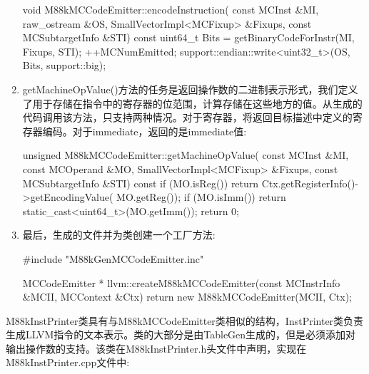 \begin{enumerate}
\begin{cpp}
void M88kMCCodeEmitter::encodeInstruction(
        const MCInst &MI, raw_ostream &OS,
        SmallVectorImpl<MCFixup> &Fixups,
        const MCSubtargetInfo &STI) const {
    uint64_t Bits =
        getBinaryCodeForInstr(MI, Fixups, STI);
    ++MCNumEmitted;
    support::endian::write<uint32_t>(OS, Bits,
                                     support::big);
}
\end{cpp}

\item
getMachineOpValue()方法的任务是返回操作数的二进制表示形式，我们定义了用于存储在指令中的寄存器的位范围，计算存储在这些地方的值。从生成的代码调用该方法，只支持两种情况。对于寄存器，将返回目标描述中定义的寄存器编码。对于immediate，返回的是immediate值:

\begin{cpp}
unsigned M88kMCCodeEmitter::getMachineOpValue(
        const MCInst &MI, const MCOperand &MO,
        SmallVectorImpl<MCFixup> &Fixups,
        const MCSubtargetInfo &STI) const {
    if (MO.isReg())
        return Ctx.getRegisterInfo()->getEncodingValue(
            MO.getReg());
    if (MO.isImm())
        return static_cast<uint64_t>(MO.getImm());
    return 0;
}
\end{cpp}

\item
最后，生成的文件并为类创建一个工厂方法:

\begin{cpp}
#include "M88kGenMCCodeEmitter.inc"

MCCodeEmitter *
llvm::createM88kMCCodeEmitter(const MCInstrInfo &MCII,
                              MCContext &Ctx) {
    return new M88kMCCodeEmitter(MCII, Ctx);
}
\end{cpp}
\end{enumerate}


M88kInstPrinter类具有与M88kMCCodeEmitter类相似的结构，InstPrinter类负责生成LLVM指令的文本表示。类的大部分是由TableGen生成的，但是必须添加对输出操作数的支持。该类在M88kInstPrinter.h头文件中声明，实现在M88kInstPrinter.cpp文件中:

